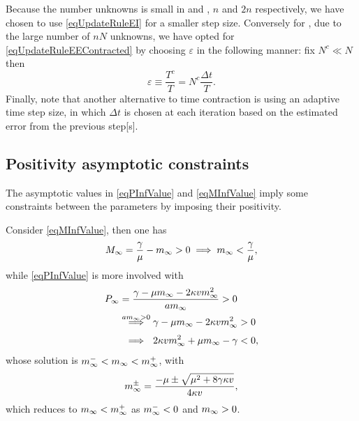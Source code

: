                 Because the number unknowns is small in \FKdiscrete{} and \HDdiscrete{}, $n$ and $2n$ respectively, we have chosen to use \eqref{eqUpdateRuleEI} for a smaller step size. Conversely for \SMOdiscrete{}, due to the large number of $nN$ unknowns, we have opted for \eqref{eqUpdateRuleEEContracted} by choosing $\varepsilon$ in the following manner: fix $N^c\ll N$ then
                \begin{equation*}
                    \varepsilon\equiv\frac {T^c}T=N^c\frac {\Delta t}T.
                \end{equation*}
                Finally, note that another alternative to time contraction is using an adaptive time step size, in which $\Delta t$ is chosen at each iteration based on the estimated error from the previous step[s]. \cite{PPSCWeinzierl2021}

            \subsection{Positivity asymptotic constraints}\label{apxSMOPositivityAsmptoticConstraint}

                The asymptotic values in \eqref{eqPInfValue} and \eqref{eqMInfValue} imply some constraints between the \SMOcontinuous{} parameters by imposing their positivity.

                Consider \eqref{eqMInfValue}, then one has
                \begin{equation}
                    \MInf=\frac\gamma\mu-\mInf>0
                    \;\implies\;
                    \mInf<\frac\gamma\mu,
                    \label{eqMInfPosConstraint}
                \end{equation}
                while \eqref{eqPInfValue} is more involved with
                \begin{equation}
                    \begin{aligned}
                        \PInf&=\frac{\gamma-\mu\mInf-2\kappa v\mInf^2}{a\mInf}>0\\
                        &\overset{a\mInf>0}{\;\implies\;}
                        \gamma-\mu\mInf-2\kappa v\mInf^2>0\\
                        &\overset{\phantom{a\mInf>0}}{\;\implies\;}
                        2\kappa v\mInf^2+\mu\mInf-\gamma<0,
                    \end{aligned}
                    \label{eqPInfPosConstraint}
                \end{equation}
                whose solution is $m_\infty^-<m_\infty<m_\infty^+$, with
                \begin{equation}
                    m_\infty^\pm=
                    \frac{-\mu\pm\sqrt{\mu^2+8\gamma\kappa v}}{4\kappa v},
                    \label{eqPInfParabolaSol}
                \end{equation}
                which reduces to $m_\infty<m_\infty^+$ as $m_\infty^-<0$ and $m_\infty>0$.

